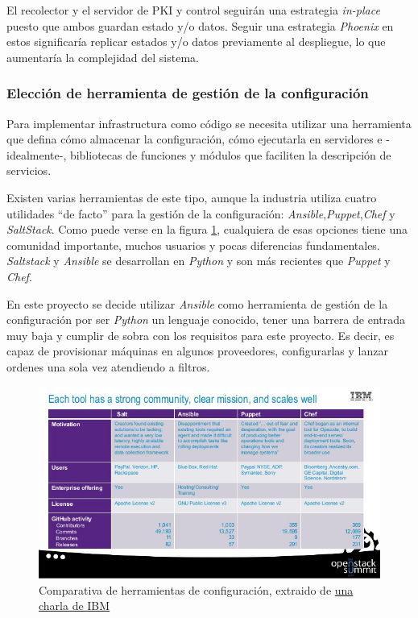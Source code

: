 El recolector y el servidor de PKI y control seguirán una estrategia \emph{in-place} puesto que ambos guardan estado y/o datos. Seguir una estrategia \emph{Phoenix} en estos
significaría replicar estados y/o datos previamente al despliegue, lo que aumentaría la complejidad del sistema.

\subsubsection{Elección de herramienta de gestión de la configuración}

Para implementar infrastructura como código se necesita utilizar una herramienta que defina cómo almacenar la configuración,
cómo ejecutarla en servidores e -idealmente-, bibliotecas de funciones y módulos que faciliten la descripción de servicios.

Existen varias herramientas de este tipo, aunque la industria utiliza cuatro utilidades ``de facto'' para la gestión de la configuración: \emph{Ansible},\emph{Puppet},\emph{Chef}
y  \emph{SaltStack}. Como puede verse en la figura \ref{fig:configmanagement1}, cualquiera de esas opciones tiene una comunidad importante, muchos usuarios y pocas diferencias
fundamentales. \emph{Saltstack} y \emph{Ansible} se desarrollan en \emph{Python} y son más recientes que \emph{Puppet} y \emph{Chef}.

En este proyecto se decide utilizar \emph{Ansible} como herramienta de gestión de la configuración por ser \emph{Python} un lenguaje conocido, tener una barrera de entrada muy baja
y cumplir de sobra con los requisitos para este proyecto. Es decir, es capaz de provisionar máquinas en algunos proveedores, configurarlas y lanzar ordenes una sola vez atendiendo a filtros.

\begin{figure}[h]
    \centering
      \includegraphics[scale=0.5]{images/configmanagement_tools1}
    \caption{Comparativa de herramientas de configuración, extraido de \href{https://www.slideshare.net/DanielKrook/caps-whats-best-for-deploying-and-managing-openstack-chef-vs-ansible-vs-puppet-vs-salt}{una charla de IBM}}
    \label{fig:configmanagement1}
  \end{figure}

